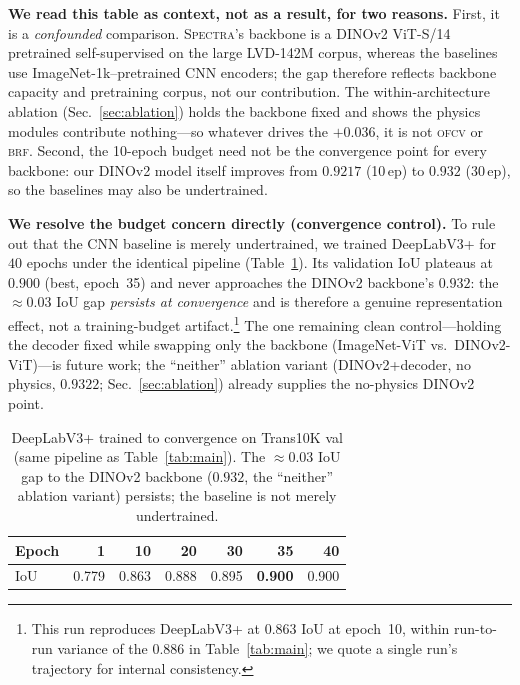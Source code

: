 \documentclass{bmvc2k}
\newcommand{\spectra}{\textsc{Spectra}}
\newcommand{\ofcv}{\textsc{ofcv}}
\newcommand{\brf}{\textsc{brf}}
\newcommand{\dinov}{DINOv2}
\newcommand{\iou}{IoU}
\newcommand{\best}[1]{\textbf{#1}}
\begin{document}
\textbf{We read this table as context, not as a result, for two reasons.}
First, it is a \emph{confounded} comparison. \spectra{}'s backbone is a \dinov{}
ViT-S/14 pretrained self-supervised on the large LVD-142M corpus, whereas the
baselines use ImageNet-1k--pretrained CNN encoders; the gap therefore reflects
backbone capacity and pretraining corpus, not our contribution. The
within-architecture ablation (Sec.~\ref{sec:ablation}) holds the backbone fixed
and shows the physics modules contribute nothing---so whatever drives the
$+0.036$, it is not \ofcv{} or \brf. Second, the 10-epoch budget need not be the
convergence point for every backbone: our \dinov{} model itself improves from
$0.9217$ (10\,ep) to $0.932$ (30\,ep), so the baselines may also be undertrained.

\textbf{We resolve the budget concern directly (convergence control).} To rule
out that the CNN baseline is merely undertrained, we trained DeepLabV3+ for $40$
epochs under the identical pipeline (Table~\ref{tab:converge}). Its validation
\iou{} plateaus at $0.900$ (best, epoch~35) and never approaches the \dinov{}
backbone's $0.932$: the ${\approx}0.03$ \iou{} gap \emph{persists at
convergence} and is therefore a genuine representation effect, not a
training-budget artifact.\footnote{This run reproduces DeepLabV3+ at $0.863$
\iou{} at epoch~10, within run-to-run variance of the $0.886$ in
Table~\ref{tab:main}; we quote a single run's trajectory for internal
consistency.} The one remaining clean control---holding the decoder fixed while
swapping only the backbone (ImageNet-ViT vs.\ \dinov-ViT)---is future work; the
``neither'' ablation variant (\dinov{}+decoder, no physics, $0.9322$;
Sec.~\ref{sec:ablation}) already supplies the no-physics DINOv2 point.

\begin{table}[t]
\centering
\caption{DeepLabV3+ trained to convergence on Trans10K val (same pipeline as
Table~\ref{tab:main}). The ${\approx}0.03$ \iou{} gap to the \dinov{} backbone
($0.932$, the ``neither'' ablation variant) persists; the baseline is not merely
undertrained.}
\label{tab:converge}
\setlength{\tabcolsep}{5pt}
\begin{tabular}{lrrrrrr}
\toprule
Epoch & 1 & 10 & 20 & 30 & 35 & 40 \\
\midrule
\iou{} & 0.779 & 0.863 & 0.888 & 0.895 & \best{0.900} & 0.900 \\
\bottomrule
\end{tabular}
\end{table}
\end{document}
